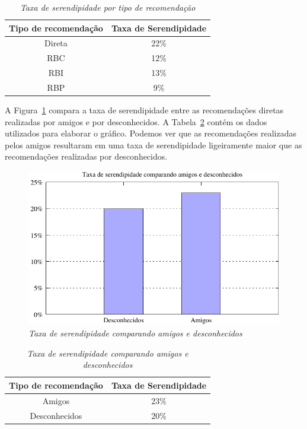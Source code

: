 \begin{table}
\centering
\begin{tabular}{c c}
    \hline \hline
    \textbf{Tipo de recomendação} & \textbf{Taxa de Serendipidade} \\
\hline 
Direta & 22\% \\
\hline 
RBC & 12\% \\
\hline 
RBI & 13\% \\
\hline 
RBP & 9\% \\
\hline        
\end{tabular}
\caption{\it Taxa de serendipidade por tipo de recomendação}
\label{table:serendipidade}
\end{table}

A Figura~\ref{fig:serendipidade_diretas} compara a taxa de serendipidade entre as recomendações diretas realizadas por amigos e por desconhecidos. A Tabela~\ref{table:serendipidade_diretas} contém os dados utilizados para elaborar o gráfico. Podemos ver que as recomendações realizadas pelos amigos resultaram em uma taxa de serendipidade ligeiramente maior que as recomendações realizadas por desconhecidos.

\begin{figure}
    \centering
    \includegraphics[width=\textwidth]{imagens/grafico_serendipidade_diretas}
    \caption{\it Taxa de serendipidade comparando amigos e desconhecidos}
    \label{fig:serendipidade_diretas}
\end{figure}

\begin{table}
\centering
\begin{tabular}{c c}
    \hline \hline
    \textbf{Tipo de recomendação} & \textbf{Taxa de Serendipidade} \\
\hline 
Amigos & 23\% \\
\hline 
Desconhecidos & 20\% \\
\hline        
\end{tabular}
\caption{\it Taxa de serendipidade comparando amigos e desconhecidos}
\label{table:serendipidade_diretas}
\end{table}

